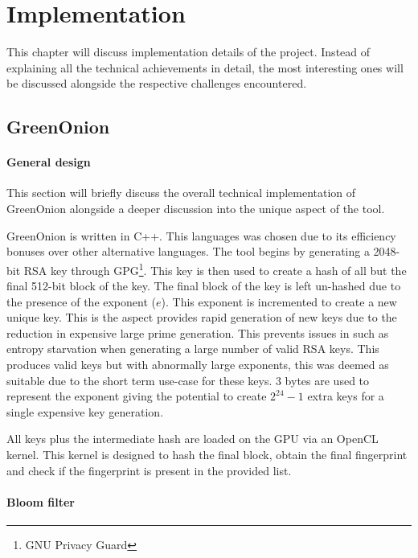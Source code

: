 \chapter{Implementation}
\label{cha:Implementation}

This chapter will discuss implementation details of the project. Instead of explaining all the technical achievements in detail, the most interesting ones will be discussed alongside the respective challenges encountered.

\section{GreenOnion}

\subsubsection{General design}
This section will briefly discuss the overall technical implementation of GreenOnion alongside a deeper discussion into the unique aspect of the tool.

GreenOnion is written in C++. This languages was chosen due to its efficiency bonuses over other alternative languages.
The tool begins by generating a 2048-bit RSA key through GPG\footnote{GNU Privacy Guard}. This key is then used to create a hash of all but the final 512-bit block of the key. The final block of the key is left un-hashed due to the presence of the exponent ($e$). This exponent is incremented to create a new unique key. This is the aspect provides rapid generation of new keys due to the reduction in expensive large prime generation. This prevents issues in such as entropy starvation when generating a large number of valid RSA keys. This produces valid keys but with abnormally large exponents, this was deemed as suitable due to the short term use-case for these keys. 3 bytes are used to represent the exponent giving the potential to create $2^{24} - 1$ extra keys for a single expensive key generation.

All keys plus the intermediate hash are loaded on the GPU via an OpenCL kernel. This kernel is designed to hash the final block, obtain the final fingerprint and check if the fingerprint is present in the provided list.

\subsubsection{Bloom filter}

